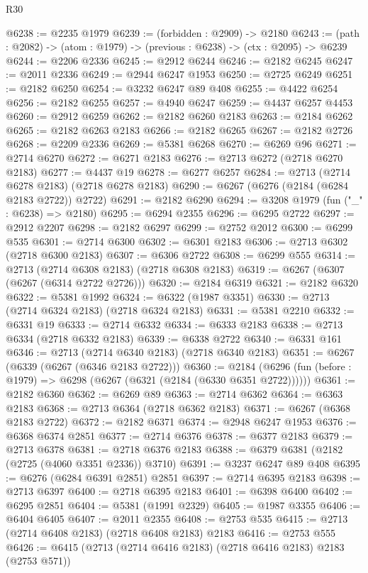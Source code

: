 \begin{lexlean}{R30}
\begin{coremodule}
@6238 := @2235 @1979
@6239 := (forbidden : @2909) -> @2180
@6243 := (path : @2082) -> (atom : @1979) -> (previous : @6238) -> (ctx : @2095) -> @6239
@6244 := @2206 @2336
@6245 := @2912 @6244
@6246 := @2182 @6245
@6247 := @2011 @2336
@6249 := @2944 @6247 @1953
@6250 := @2725 @6249
@6251 := @2182 @6250
@6254 := @3232 @6247 @89 @408
@6255 := @4422 @6254
@6256 := @2182 @6255
@6257 := @4940 @6247
@6259 := @4437 @6257 @4453
@6260 := @2912 @6259
@6262 := @2182 @6260 @2183
@6263 := @2184 @6262
@6265 := @2182 @6263 @2183
@6266 := @2182 @6265
@6267 := @2182 @2726
@6268 := @2209 @2336
@6269 := @5381 @6268
@6270 := @6269 @96
@6271 := @2714 @6270
@6272 := @6271 @2183
@6276 := @2713 @6272 (@2718 @6270 @2183)
@6277 := @4437 @19
@6278 := @6277 @6257
@6284 := @2713 (@2714 @6278 @2183) (@2718 @6278 @2183)
@6290 := @6267 (@6276 (@2184 (@6284 @2183 @2722)) @2722)
@6291 := @2182 @6290
@6294 := @3208 @1979 (fun ("_" : @6238) => @2180)
@6295 := @6294 @2355
@6296 := @6295 @2722
@6297 := @2912 @2207
@6298 := @2182 @6297
@6299 := @2752 @2012
@6300 := @6299 @535
@6301 := @2714 @6300
@6302 := @6301 @2183
@6306 := @2713 @6302 (@2718 @6300 @2183)
@6307 := @6306 @2722
@6308 := @6299 @555
@6314 := @2713 (@2714 @6308 @2183) (@2718 @6308 @2183)
@6319 := @6267 (@6307 (@6267 (@6314 @2722 @2726)))
@6320 := @2184 @6319
@6321 := @2182 @6320
@6322 := @5381 @1992
@6324 := @6322 (@1987 @3351)
@6330 := @2713 (@2714 @6324 @2183) (@2718 @6324 @2183)
@6331 := @5381 @2210
@6332 := @6331 @19
@6333 := @2714 @6332
@6334 := @6333 @2183
@6338 := @2713 @6334 (@2718 @6332 @2183)
@6339 := @6338 @2722
@6340 := @6331 @161
@6346 := @2713 (@2714 @6340 @2183) (@2718 @6340 @2183)
@6351 := @6267 (@6339 (@6267 (@6346 @2183 @2722)))
@6360 := @2184 (@6296 (fun (before : @1979) => @6298 (@6267 (@6321 (@2184 (@6330 @6351 @2722))))))
@6361 := @2182 @6360
@6362 := @6269 @89
@6363 := @2714 @6362
@6364 := @6363 @2183
@6368 := @2713 @6364 (@2718 @6362 @2183)
@6371 := @6267 (@6368 @2183 @2722)
@6372 := @2182 @6371
@6374 := @2948 @6247 @1953
@6376 := @6368 @6374 @2851
@6377 := @2714 @6376
@6378 := @6377 @2183
@6379 := @2713 @6378
@6381 := @2718 @6376 @2183
@6388 := @6379 @6381 (@2182 (@2725 (@4060 @3351 @2336)) @3710)
@6391 := @3237 @6247 @89 @408
@6395 := @6276 (@6284 @6391 @2851) @2851
@6397 := @2714 @6395 @2183
@6398 := @2713 @6397
@6400 := @2718 @6395 @2183
@6401 := @6398 @6400
@6402 := @6295 @2851
@6404 := @5381 (@1991 @2329)
@6405 := @1987 @3355
@6406 := @6404 @6405
@6407 := @2011 @2355
@6408 := @2753 @535
@6415 := @2713 (@2714 @6408 @2183) (@2718 @6408 @2183) @2183
@6416 := @2753 @555
@6426 := @6415 (@2713 (@2714 @6416 @2183) (@2718 @6416 @2183) @2183 (@2753 @571))

\end{coremodule}
\end{lexlean}
